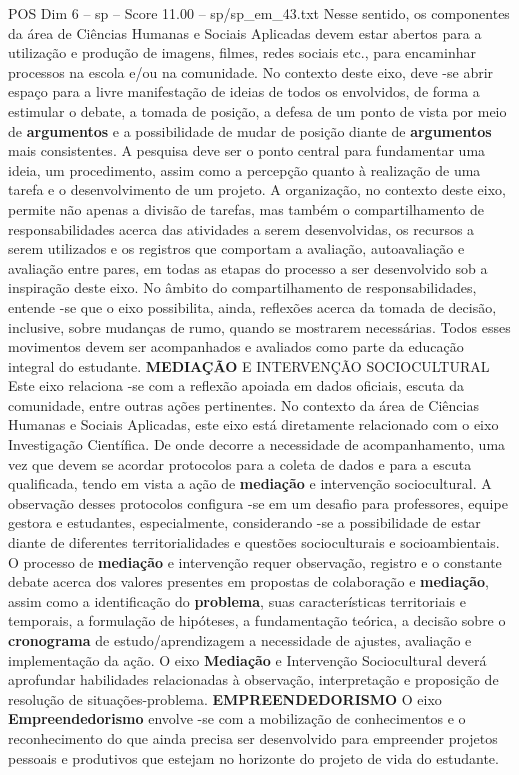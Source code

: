 \begin{textsample}{POS Dim 6 – sp – Score 11.00 – sp/sp\_em\_43.txt}
Nesse sentido, os componentes da área de Ciências Humanas e Sociais Aplicadas devem estar abertos para a utilização e produção de imagens, filmes, redes sociais etc., para encaminhar processos na escola e/ou na comunidade.
No contexto deste eixo, deve -se abrir espaço para a livre manifestação de ideias de todos os envolvidos, de forma a estimular o debate, a tomada de posição, a defesa de um ponto de vista por meio de \textbf{argumentos} e a possibilidade de mudar de posição diante de \textbf{argumentos} mais consistentes.
A pesquisa deve ser o ponto central para fundamentar uma ideia, um procedimento, assim como a percepção quanto à realização de uma tarefa e o desenvolvimento de um projeto.
A organização, no contexto deste eixo, permite não apenas a divisão de tarefas, mas também o compartilhamento de responsabilidades acerca das atividades a serem desenvolvidas, os recursos a serem utilizados e os registros que comportam a avaliação, autoavaliação e avaliação entre pares, em todas as etapas do processo a ser desenvolvido sob a inspiração deste eixo.
No âmbito do compartilhamento de responsabilidades, entende -se que o eixo possibilita, ainda, reflexões acerca da tomada de decisão, inclusive, sobre mudanças de rumo, quando se mostrarem necessárias.
Todos esses movimentos devem ser acompanhados e avaliados como parte da educação integral do estudante. \textbf{MEDIAÇÃO} E INTERVENÇÃO SOCIOCULTURAL Este eixo relaciona -se com a reflexão apoiada em dados oficiais, escuta da comunidade, entre outras ações pertinentes.
No contexto da área de Ciências Humanas e Sociais Aplicadas, este eixo está diretamente relacionado com o eixo Investigação Científica.
De onde decorre a necessidade de acompanhamento, uma vez que devem se acordar protocolos para a coleta de dados e para a escuta qualificada, tendo em vista a ação de \textbf{mediação} e intervenção sociocultural.
A observação desses protocolos configura -se em um desafio para professores, equipe gestora e estudantes, especialmente, considerando -se a possibilidade de estar diante de diferentes territorialidades e questões socioculturais e socioambientais.
O processo de \textbf{mediação} e intervenção requer observação, registro e o constante debate acerca dos valores presentes em propostas de colaboração e \textbf{mediação}, assim como a identificação do \textbf{problema}, suas características territoriais e temporais, a formulação de hipóteses, a fundamentação teórica, a decisão sobre o \textbf{cronograma} de estudo/aprendizagem a necessidade de ajustes, avaliação e implementação da ação.
O eixo \textbf{Mediação} e Intervenção Sociocultural deverá aprofundar habilidades relacionadas à observação, interpretação e proposição de resolução de situações-problema. \textbf{EMPREENDEDORISMO} O eixo \textbf{Empreendedorismo} envolve -se com a mobilização de conhecimentos e o reconhecimento do que ainda precisa ser desenvolvido para empreender projetos pessoais e produtivos que estejam no horizonte do projeto de vida do estudante.

\end{textsample}
